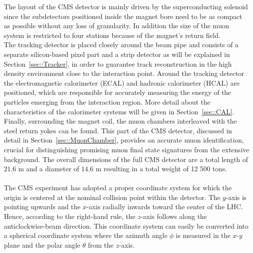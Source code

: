 The layout of the CMS detector is mainly driven by the superconducting solenoid since the subdetectors positioned inside the magnet bore need to be as compact as possible without any loss of granularity. In addition the size of the muon system is restricted to four stations because of the magnet's return field.
\\
The tracking detector is placed closely around the beam pipe and consists of a separate silicon-based pixel part and a strip detector as will be explained in Section~\ref{sec::Tracker}, in order to guarantee track reconstruction in the high density environment close to the interaction point.
Around the tracking detector the electromagnetic calorimeter (ECAL) and hadronic calorimeter (HCAL) are positioned, which are responsible for accurately measuring the energy of the particles emerging from the interaction region. More detail about the characteristics of the calorimeter systems will be given in Section~\ref{sec::CAL}. Finally, surrounding the magnet coil, the muon chambers interleaved with the steel return yokes can be found. This part of the CMS detector, discussed in detail in Section~\ref{sec::MuonChamber}, provides an accurate muon identification, crucial for distinguishing promising muon final state signatures from the extensive background. 
The overall dimensions of the full CMS detector are a total length of $21.6$ m and a diameter of $14.6$ m resulting in a total weight of 12 500 tons.
\\
\\
The CMS experiment has adopted a proper coordinate system for which the origin is centered at the nominal collision point within the detector. The $y$-axis is pointing upwards and the $x$-axis radially inwards toward the center of the LHC. Hence, according to the right-hand rule, the $z$-axis follows along the anticlockwise-beam direction. This coordinate system can easily be converted into a spherical coordinate system where the azimuth angle $\phi$ is measured in the $x$-$y$ plane and the polar angle $\theta$ from the $z$-axis. 
